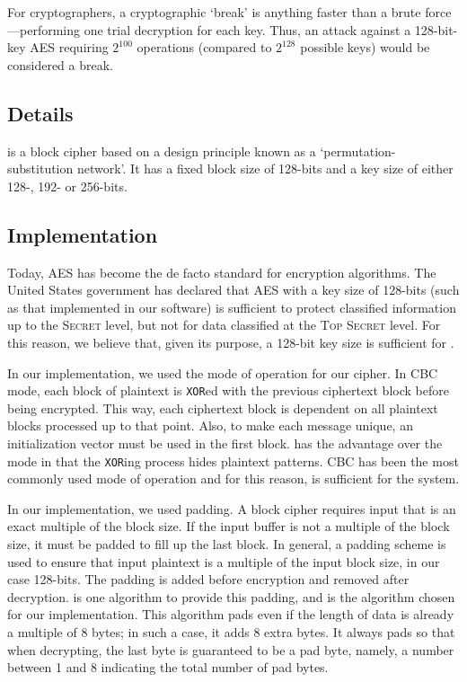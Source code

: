 \documentclass[a4paper,11pt]{article}
\begin{document}
For cryptographers, a cryptographic `break' is anything faster than a brute 
force—performing one trial decryption for each key. Thus, an attack against a 
128-bit-key AES requiring $2^{100}$ operations (compared to $2^{128}$ possible 
keys) would be considered a break.

\subsection{Details}
 is a block cipher based on a design principle known as a 
`permutation-substitution network'. It has a fixed block size of 128-bits and a
key size of either 128-, 192- or 256-bits. 

\subsection{Implementation}
Today, AES has become the de facto standard for encryption algorithms. The 
United States government has declared that AES with a key size of 128-bits (such
as that implemented in our software) is sufficient to protect classified 
information up to the \textsc{Secret} level, but not for data classified at the
\textsc{Top Secret} level. For this reason, we believe that, given its 
purpose, a 128-bit key size is sufficient for \serviceName{}.

In our implementation, we used the  mode 
of operation for our cipher. In CBC mode, each block of plaintext is 
\verb+XOR+ed with the previous ciphertext block before being encrypted. This 
way, each ciphertext block is dependent on all plaintext blocks processed up to 
that point. Also, to make each message unique, an initialization vector must be 
used in the first block.  has the advantage over the 
 mode in that the \verb+XOR+ing process 
hides plaintext patterns. CBC has been the most commonly used mode of operation 
and for this reason, is sufficient for the \serviceName{} system.

In our implementation, we used  padding.  A block cipher 
requires input that is an exact multiple of the block size. If the input buffer 
is not a multiple of the block size, it must be padded to fill up the last 
block. In general, a padding scheme is used to ensure that input plaintext is a 
multiple of the input block size, in our case 128-bits. The padding is added 
before encryption and removed after decryption.  is one 
algorithm to provide this padding, and is the algorithm chosen for our 
\packageName{} implementation. This algorithm pads even if the length of data is
already a multiple of 8 bytes; in such a case, it adds 8 extra bytes. It always 
pads so that when decrypting, the last byte is guaranteed to be a pad byte, 
namely, a number between 1 and 8 indicating the total number of pad bytes.
\end{document}
